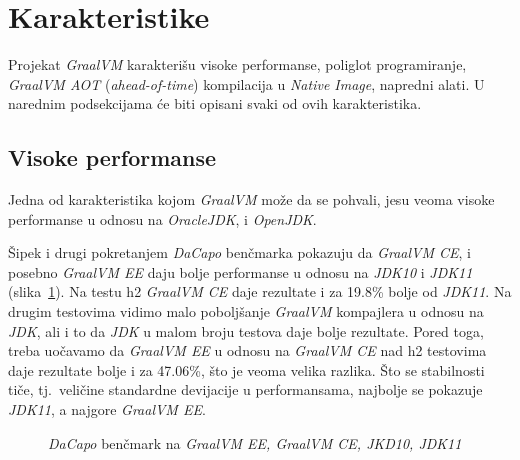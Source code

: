 \documentclass[a4paper]{article}
\begin{document}
\section{Karakteristike}
\label{sec:Karakteristike}

Projekat \emph{GraalVM} karakterišu visoke performanse, poliglot programiranje, \emph{GraalVM AOT} (\emph{ahead-of-time}) kompilacija u \emph{Native Image}, napredni alati\cite{graalvm}. U narednim podsekcijama će biti opisani svaki od ovih karakteristika.

\subsection{Visoke performanse}
\label{sub:perf}

Jedna od karakteristika kojom \emph{GraalVM} može da se pohvali, jesu veoma visoke performanse u odnosu na \emph{OracleJDK}, i \emph{OpenJDK}. 

Šipek i drugi \cite{vsipek19} pokretanjem \emph{DaCapo} benčmarka \cite{dacapo} pokazuju da \emph{GraalVM CE}, i posebno \emph{GraalVM EE} daju bolje performanse u odnosu na \emph{JDK10} i \emph{JDK11} (slika~\ref{fig:dacapo}). Na testu h2 \emph{GraalVM CE} daje rezultate i za 19.8\% bolje od \emph{JDK11}. Na drugim testovima vidimo malo poboljšanje \emph{GraalVM} kompajlera u odnosu na \emph{JDK}, ali i to da \emph{JDK} u malom broju testova daje bolje rezultate. Pored toga, treba uočavamo da \emph{GraalVM EE} u odnosu na \emph{GraalVM CE} nad h2 testovima daje rezultate bolje i za 47.06\%, što je veoma velika razlika. Što se stabilnosti tiče, tj.\ veličine standardne devijacije u performansama, najbolje se pokazuje \emph{JDK11}, a najgore \emph{GraalVM EE}.

\begin{figure}
\begin{center}
\end{center}
    \caption{\emph{DaCapo} benčmark na \emph{GraalVM EE, GraalVM CE, JKD10, JDK11}}
\label{fig:dacapo}
\end{figure}
\end{document}
